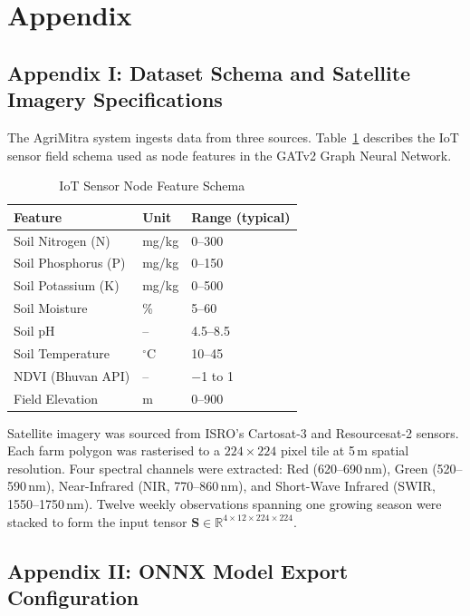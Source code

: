 \chapter*{\centering Appendix}

\section*{Appendix I: Dataset Schema and Satellite Imagery Specifications}

The AgriMitra system ingests data from three sources. Table~\ref{tab:iot_schema} describes the IoT sensor field schema used as node features in the GATv2 Graph Neural Network.

\begin{table}[H]
\centering
\caption{IoT Sensor Node Feature Schema}
\label{tab:iot_schema}
\begin{tabular}{|l|l|l|}
\hline
\textbf{Feature} & \textbf{Unit} & \textbf{Range (typical)} \\
\hline
Soil Nitrogen (N)      & mg/kg  & 0--300   \\
Soil Phosphorus (P)    & mg/kg  & 0--150   \\
Soil Potassium (K)     & mg/kg  & 0--500   \\
Soil Moisture          & \%     & 5--60    \\
Soil pH                & --     & 4.5--8.5 \\
Soil Temperature       & $^\circ$C & 10--45 \\
NDVI (Bhuvan API)      & --     & $-$1 to 1 \\
Field Elevation        & m      & 0--900   \\
\hline
\end{tabular}
\end{table}

Satellite imagery was sourced from ISRO's Cartosat-3 and Resourcesat-2 sensors. Each farm polygon was rasterised to a $224 \times 224$ pixel tile at 5\,m spatial resolution. Four spectral channels were extracted: Red (620--690\,nm), Green (520--590\,nm), Near-Infrared (NIR, 770--860\,nm), and Short-Wave Infrared (SWIR, 1550--1750\,nm). Twelve weekly observations spanning one growing season were stacked to form the input tensor $\mathbf{S} \in \mathbb{R}^{4 \times 12 \times 224 \times 224}$.

\section*{Appendix II: ONNX Model Export Configuration}

